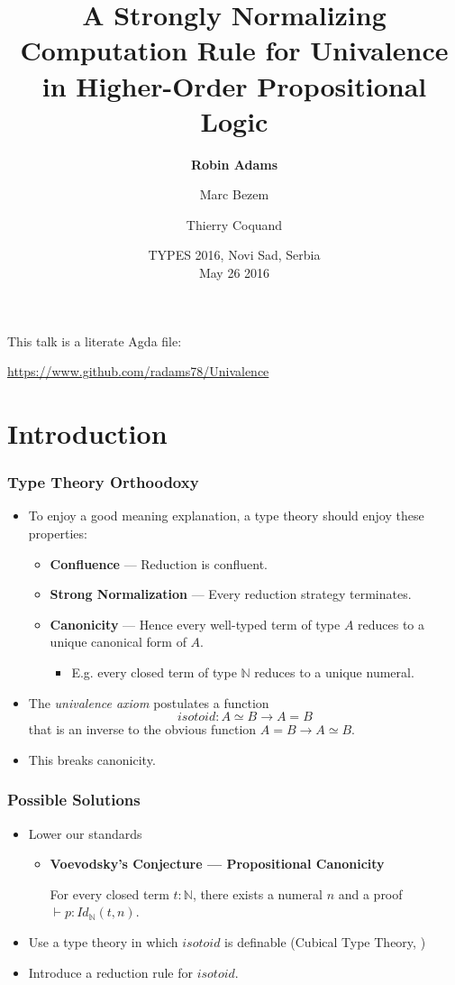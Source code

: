 \documentclass[handout]{beamer}
\title[SN Rule for Univalence]{A Strongly Normalizing Computation Rule for Univalence in Higher-Order Propositional Logic}
\author[R. Adams, M. Bezem, T. Coquand]{\textbf{Robin Adams} \and Marc Bezem \and Thierry Coquand}
\date[TYPES 2016]{TYPES 2016, Novi Sad, Serbia \\ May 26 2016}
\newcommand{\isotoid}{\ensuremath{isotoid}}
\begin{document}
\begin{frame}

\maketitle

This talk is a literate Agda file:

\url{https://www.github.com/radams78/Univalence}
\end{frame}

\section{Introduction}

\begin{frame}
\frametitle{Type Theory Orthoodoxy}
\begin{itemize}[<+->]
\item
To enjoy a good meaning explanation, a type theory should enjoy these properties:
\begin{itemize}
\item \textbf{Confluence} --- Reduction is confluent.
\item \textbf{Strong Normalization} --- Every reduction strategy terminates.
\item \textbf{Canonicity} --- Hence every well-typed term of type $A$ reduces to a unique canonical form of $A$.
\begin{itemize}
\item
E.g. every closed term of type $\mathbb{N}$ reduces to a unique numeral.
\end{itemize}
\end{itemize}
\item 
The \emph{univalence axiom} postulates a function
\[ \isotoid : A \simeq B \rightarrow A = B \]
that is an inverse to the obvious function $A = B \rightarrow A \simeq B$.
\item
This breaks canonicity.
\end{itemize}
\end{frame}

\begin{frame}
\frametitle{Possible Solutions}
\begin{itemize}[<+->]
\item
Lower our standards
\begin{itemize}
\item
\textbf{Voevodsky's Conjecture --- Propositional Canonicity}

For every closed term $t : \mathbb{N}$, there exists a numeral $n$ and a proof $\vdash p : Id_\mathbb{N}(t,n)$.
\end{itemize}
\item
Use a type theory in which $\isotoid$ is definable (Cubical Type Theory, \cite{Polonsky14a}) %
\item
Introduce a reduction rule for $\isotoid$.
\end{itemize}
\end{frame}
\end{document}
